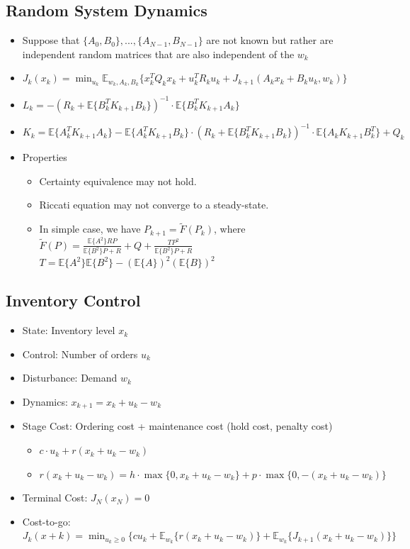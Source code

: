 \subsection{Random System Dynamics}
\begin{itemize}
    \item Suppose that $\{A_0,B_0\},...,\{A_{N-1},B_{N-1}\}$ are not known but rather are independent random matrices that are also independent of the $w_k$
    \item $J_k(x_k) = \min_{u_k}\mathbb{E}_{w_k,A_k,B_k}\{ x_k^TQ_kx_k + u_k^TR_ku_k + J_{k+1}(A_kx_k+B_ku_k,w_k) \}$
    \item $L_k = -(R_k+\mathbb{E}\{ B_k^TK_{k+1}B_k \})^{-1} \cdot \mathbb{E}\{ B_k^TK_{k+1}A_k \}$
    \item $K_k=\mathbb{E}\{ A_k^TK_{k+1}A_k \} - \mathbb{E}\{ A_k^TK_{k+1}B_k \} \cdot (R_k+\mathbb{E}\{ B_k^TK_{k+1}B_k \})^{-1}\cdot \mathbb{E}\{ A_kK_{k+1}B_k^T \} + Q_k$
    \item Properties
    \begin{itemize}
        \item Certainty equivalence may not hold.
        \item Riccati equation may not converge to a steady-state.
        \item In simple case, we have $P_{k+1}=\tilde{F}(P_k)$, where \\
        $\tilde{F}(P)=\frac{\mathbb{E}\{ A^2 \}RP}{\mathbb{E}\{B^2\}P+R} + Q + \frac{TP^2}{\mathbb{E}\{B^2\}P+R}$\\
        $T = \mathbb{E}\{A^2\}\mathbb{E}\{B^2\}-(\mathbb{E}\{A\})^2(\mathbb{E}\{B\})^2$
    \end{itemize}
\end{itemize}
\newpage
\subsection{Inventory Control}
\begin{itemize}
    \item State: Inventory level $x_k$
    \item Control: Number of orders $u_k$
    \item Disturbance: Demand $w_k$
    \item Dynamics: $x_{k+1}=x_k+u_k-w_k$
    \item Stage Cost: Ordering cost + maintenance cost (hold cost, penalty cost) 
    \begin{itemize}
        \item $c\cdot u_k + r(x_k+u_k-w_k)$
        \item $r(x_k+u_k-w_k) = h\cdot \max\{0,x_k+u_k-w_k\} + p\cdot \max\{0,-(x_k+u_k-w_k)\}$
    \end{itemize}
    \item Terminal Cost: $J_N(x_N)=0$
    \item Cost-to-go: $J_k(x+k)=\min_{u_k\geq 0}\{ cu_k+\mathbb{E}_{w_k} \{ r(x_k+u_k-w_k) \} + \mathbb{E}_{w_k}\{ J_{k+1}(x_k+u_k-w_k) \} \}$
\end{itemize}